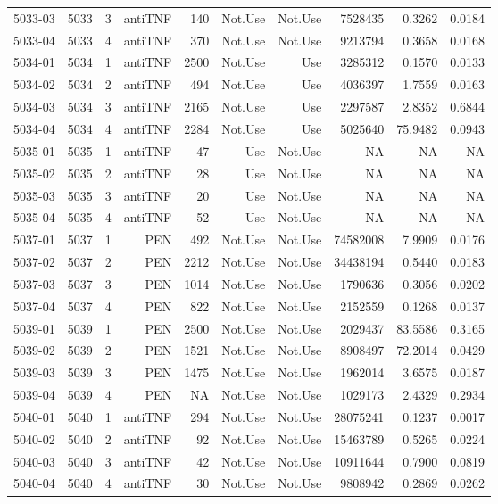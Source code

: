 {\begin{longtable}{ | r | r | r | r | r | r | r | r | r | r | }
5033-03 & 5033 & 3 & antiTNF & 140 & Not.Use & Not.Use & 7528435 & 0.3262 & 0.0184\\ 
5033-04 & 5033 & 4 & antiTNF & 370 & Not.Use & Not.Use & 9213794 & 0.3658 & 0.0168\\ 
5034-01 & 5034 & 1 & antiTNF & 2500 & Not.Use & Use & 3285312 & 0.1570 & 0.0133\\ 
5034-02 & 5034 & 2 & antiTNF & 494 & Not.Use & Use & 4036397 & 1.7559 & 0.0163\\ 
5034-03 & 5034 & 3 & antiTNF & 2165 & Not.Use & Use & 2297587 & 2.8352 & 0.6844\\ 
5034-04 & 5034 & 4 & antiTNF & 2284 & Not.Use & Use & 5025640 & 75.9482 & 0.0943\\ 
5035-01 & 5035 & 1 & antiTNF & 47 & Use & Not.Use & NA & NA & NA\\ 
5035-02 & 5035 & 2 & antiTNF & 28 & Use & Not.Use & NA & NA & NA\\ 
5035-03 & 5035 & 3 & antiTNF & 20 & Use & Not.Use & NA & NA & NA\\ 
5035-04 & 5035 & 4 & antiTNF & 52 & Use & Not.Use & NA & NA & NA\\ 
5037-01 & 5037 & 1 & PEN & 492 & Not.Use & Not.Use & 74582008 & 7.9909 & 0.0176\\ 
5037-02 & 5037 & 2 & PEN & 2212 & Not.Use & Not.Use & 34438194 & 0.5440 & 0.0183\\ 
5037-03 & 5037 & 3 & PEN & 1014 & Not.Use & Not.Use & 1790636 & 0.3056 & 0.0202\\ 
5037-04 & 5037 & 4 & PEN & 822 & Not.Use & Not.Use & 2152559 & 0.1268 & 0.0137\\ 
5039-01 & 5039 & 1 & PEN & 2500 & Not.Use & Not.Use & 2029437 & 83.5586 & 0.3165\\ 
5039-02 & 5039 & 2 & PEN & 1521 & Not.Use & Not.Use & 8908497 & 72.2014 & 0.0429\\ 
5039-03 & 5039 & 3 & PEN & 1475 & Not.Use & Not.Use & 1962014 & 3.6575 & 0.0187\\ 
5039-04 & 5039 & 4 & PEN & NA & Not.Use & Not.Use & 1029173 & 2.4329 & 0.2934\\ 
5040-01 & 5040 & 1 & antiTNF & 294 & Not.Use & Not.Use & 28075241 & 0.1237 & 0.0017\\ 
5040-02 & 5040 & 2 & antiTNF & 92 & Not.Use & Not.Use & 15463789 & 0.5265 & 0.0224\\ 
5040-03 & 5040 & 3 & antiTNF & 42 & Not.Use & Not.Use & 10911644 & 0.7900 & 0.0819\\ 
5040-04 & 5040 & 4 & antiTNF & 30 & Not.Use & Not.Use & 9808942 & 0.2869 & 0.0262\\ 

\end{longtable}}
